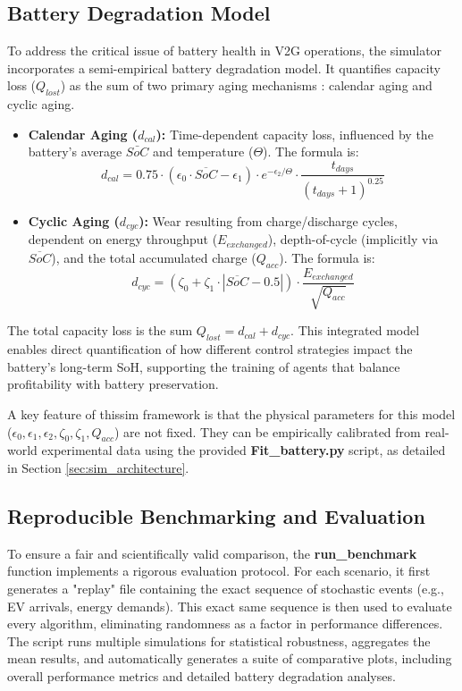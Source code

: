\subsection{Battery Degradation Model}
To address the critical issue of battery health in V2G operations, the simulator incorporates a semi-empirical battery degradation model. It quantifies capacity loss ($Q_{lost}$) as the sum of two primary aging mechanisms \cite{orfanoudakis2024ev2gym}: calendar aging and cyclic aging.

\noindent
\begin{itemize}
    \item \textbf{Calendar Aging ($d_{cal}$):} Time-dependent capacity loss, influenced by the battery's average $\bar{SoC}$ and temperature ($\Theta$). The formula is:
    \begin{equation}
        d_{cal} = 0.75 \cdot (\epsilon_0 \cdot \overline{SoC} - \epsilon_1) \cdot e^{-\epsilon_2/\Theta} \cdot \frac{t_{days}}{(t_{days}+1)^{0.25}}
    \end{equation}
    
    \item \textbf{Cyclic Aging ($d_{cyc}$):} Wear resulting from charge/discharge cycles, dependent on energy throughput ($E_{exchanged}$), depth-of-cycle (implicitly via $\overline{SoC}$), and the total accumulated charge ($Q_{acc}$). The formula is:
    \begin{equation}
        d_{cyc} = (\zeta_0 + \zeta_1 \cdot |\overline{SoC}-0.5|) \cdot \frac{E_{exchanged}}{\sqrt{Q_{acc}}}
    \end{equation}
\end{itemize}

\noindent
The total capacity loss is the sum $Q_{lost} = d_{cal} + d_{cyc}$. This integrated model enables direct quantification of how different control strategies impact the battery's long-term SoH, supporting the training of agents that balance profitability with battery preservation.

\noindent
A key feature of thissim framework is that the physical parameters for this model ($\epsilon_0, \epsilon_1, \epsilon_2, \zeta_0, \zeta_1, Q_{acc}$) are not fixed. They can be empirically calibrated from real-world experimental data using the provided \textbf{Fit\_battery.py} script, as detailed in Section \ref{sec:sim_architecture}.




\subsection{Reproducible Benchmarking and Evaluation}
To ensure a fair and scientifically valid comparison, the \textbf{run\_benchmark} function implements a rigorous evaluation protocol. For each scenario, it first generates a "replay" file containing the exact sequence of stochastic events (e.g., EV arrivals, energy demands). This exact same sequence is then used to evaluate every algorithm, eliminating randomness as a factor in performance differences. The script runs multiple simulations for statistical robustness, aggregates the mean results, and automatically generates a suite of comparative plots, including overall performance metrics and detailed battery degradation analyses.

